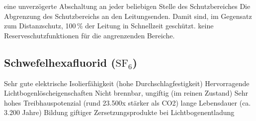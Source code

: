     \begin{itemize}
        \pro eine unverzögerte Abschaltung an jeder beliebigen Stelle des Schutzbereiches
        \pro Die Abgrenzung des Schutzbereichs an den Leitungsenden. Damit sind, im Gegensatz zum Distanzschutz, 100\,\% der Leitung in Schnellzeit geschützt.
        \con keine Reserveschutzfunktionen für die angrenzenden Bereiche.
    \end{itemize}

\subsection[Schwefelhexafluorid (SF6)]{Schwefelhexafluorid ($\mathrm{SF_6}$)}
    \begin{itemize} 
        \pro Sehr gute elektrische Isolierfähigkeit (hohe Durchschlagfestigkeit)
        \pro Hervorragende Lichtbogenlöscheigenschaften
        \pro Nicht brennbar, ungiftig (im reinen Zustand)
        \con Sehr hohes Treibhauspotenzial (rund 23.500x stärker als CO2)
        \con lange Lebensdauer (ca. 3.200 Jahre)
        \con Bildung giftiger Zersetzungsprodukte bei Lichtbogenentladung
    \end{itemize}

